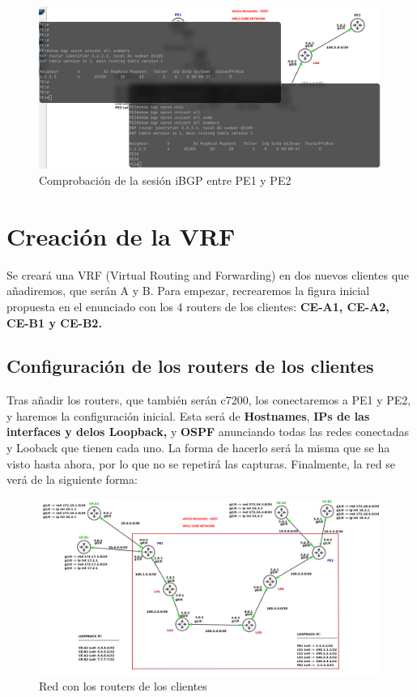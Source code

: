 \documentclass{article}
\begin{document}
\begin{figure}[h]
    \centering
    \includegraphics[width=1\textwidth]{src/vecinos.png}
    \caption{Comprobación de la sesión iBGP entre PE1 y PE2}
\end{figure}

\section{Creación de la VRF}

Se creará una VRF (Virtual Routing and Forwarding) en dos nuevos clientes que añadiremos, que serán A y B. Para empezar, recrearemos la figura inicial propuesta en el enunciado con los 4 routers de los clientes: \textbf{CE-A1, CE-A2, CE-B1 y CE-B2.}

\subsection{Configuración de los routers de los clientes}
Tras añadir los routers, que también serán c7200, los conectaremos a PE1 y PE2, y haremos la configuración inicial. Esta será de \textbf{Hostnames}, \textbf{IPs de las interfaces y delos Loopback,} y \textbf{OSPF} anunciando todas las redes conectadas y Looback que tienen cada uno. La forma de hacerlo será la misma que se ha visto hasta ahora, por lo que no se repetirá las capturas. Finalmente, la red se verá de la siguiente forma:

\begin{figure}[h]
    \centering
    \includegraphics[width=1\textwidth]{src/ClientesNuevos.png}
    \caption{Red con los routers de los clientes}
\end{figure}
\end{document}
